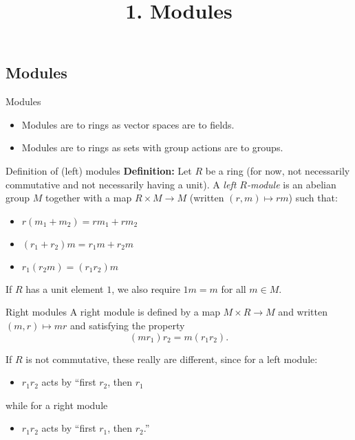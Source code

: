 \documentclass[
  ignorenonframetext,
]{beamer}
\title{1. Modules}
\author{}
\date{}
\providecommand{\tightlist}{%
  \setlength{\itemsep}{0pt}\setlength{\parskip}{0pt}}
\begin{document}
\frame{\titlepage}

\hypertarget{modules}{%
\subsection{Modules}\label{modules}}

\begin{frame}{Modules}
\begin{itemize}
\tightlist
\item
  Modules are to rings as vector spaces are to fields.
\item
  Modules are to rings as sets with group actions are to groups.
\end{itemize}
\end{frame}

\begin{frame}{Definition of (left) modules}
\protect\hypertarget{definition-of-left-modules}{}
\textbf{Definition:} Let \(R\) be a ring (for now, not necessarily
commutative and not necessarily having a unit). A \emph{left
\(R\)-module} is an abelian group \(M\) together with a map
\(R\times M\to M\) (written \((r,m)\mapsto rm\)) such that:

\begin{itemize}
\tightlist
\item
  \(r(m_1+m_2)=rm_1+rm_2\)
\item
  \((r_1+r_2)m = r_1 m + r_2 m\)
\item
  \(r_1 (r_2 m) = (r_1 r_2) m\)
\end{itemize}

If \(R\) has a unit element \(1\), we also require \(1m=m\) for all
\(m\in M\).
\end{frame}

\begin{frame}{Right modules}
\protect\hypertarget{right-modules}{}
A right module is defined by a map \(M\times R\to M\) and written
\((m,r)\mapsto mr\) and satisfying the property \[
(m r_1)r_2 = m(r_1 r_2).
\]

If \(R\) is not commutative, these really are different, since for a
left module:

\begin{itemize}
\tightlist
\item
  \(r_1 r_2\) acts by ``first \(r_2\), then \(r_1\)
\end{itemize}

while for a right module

\begin{itemize}
\tightlist
\item
  \(r_1 r_2\) acts by ``first \(r_1\), then \(r_2\).''
\end{itemize}
\end{frame}
\end{document}
